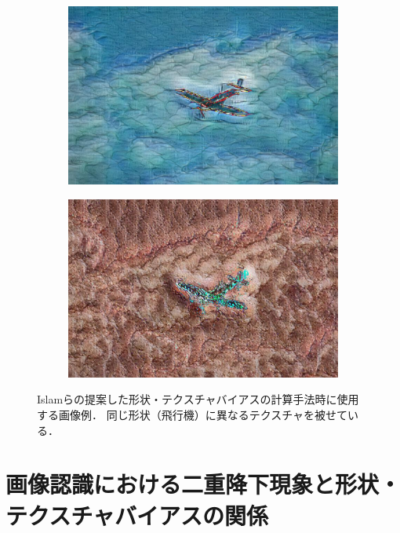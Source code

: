 \begin{figure}[h]
\begin{subfigure}[b]{0.19\linewidth}
    \end{subfigure}
    \begin{subfigure}[b]{0.19\linewidth}
        \includegraphics[width=\linewidth]{fig/islam_dataset/islam_4.pdf}
    \end{subfigure}
    \begin{subfigure}[b]{0.19\linewidth}
        \includegraphics[width=\linewidth]{fig/islam_dataset/islam_5.pdf}
    \end{subfigure}
    \caption[Islamらの提案した形状・テクスチャバイアスの計算手法時に使用する画像例]{Islamらの提案した形状・テクスチャバイアスの計算手法時に使用する画像例．
    同じ形状（飛行機）に異なるテクスチャを被せている．}
    \label{fig:esserset}
\end{figure}

\newpage

\section{画像認識における二重降下現象と形状・テクスチャバイアスの関係}


